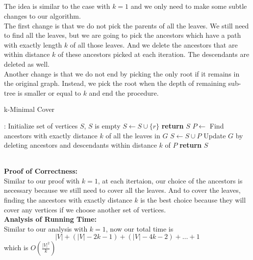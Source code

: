 \documentclass[12pt,letterpaper]{article}
\begin{document}
\subsection{}
The idea is similar to the case with $k=1$ and we only need to make some subtle changes to our algorithm.\\
The first change is that we do not pick the parents of all the leaves.
We still need to find all the leaves, 
but we are going to pick the ancestors which have a path with exactly length $k$ of all those leaves.
And we delete the ancestors that are within distance $k$ of these ancestors picked at each iteration.
The descendants are deleted as well.\\
Another change is that we do not end by picking the only root if it remains in the original graph.
Instead, we pick the root when the depth of remaining sub-tree is smaller or equal to $k$ and end the procedure.
\begin{algorithm}
  \caption{k-Minimal Cover}\label{alg:kcover}
  \begin{algorithmic}[1]
  :
  \State Initialize set of vertices $S$, $S$ is empty
  \State $S\gets S\cup\{r\}$
  \State \textbf{return} $S$
  \EndIf
  \State $P\gets$ Find ancestors with exactly distance $k$ of all the leaves in $G$
  \State $S\gets S\cup P$
  \State Update $G$ by deleting ancestors and descendants within distance $k$ of $P$ 
  \EndWhile
  \State \textbf{return} $S$
  \EndProcedure
  \end{algorithmic}
\end{algorithm}\\
\textbf{Proof of Correctness:}\\
Similar to our proof with $k=1$, at each itertaion,
our choice of the ancestors is necessary because we still need to cover all the leaves.
And to cover the leaves, finding the ancestors with exactly distance $k$ is the best choice 
because they will cover any vertices if we choose another set of vertices.\\
\textbf{Analysis of Running Time:}\\
Similar to our analysis with $k=1$, now our total time is 
$$|V|+(|V|-2k-1)+(|V|-4k-2)+\dots+1$$
which is $O(\frac{|V|^2}{k})$

\section{}
\end{document}
